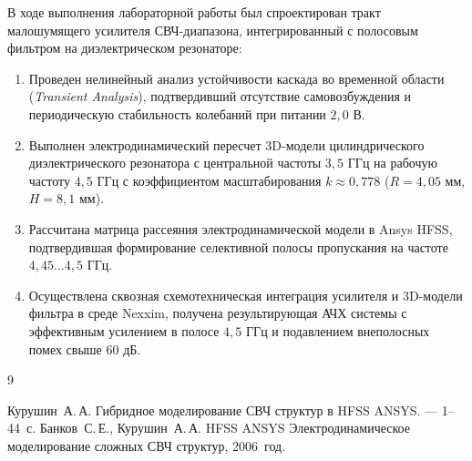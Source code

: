 В ходе выполнения лабораторной работы был спроектирован тракт малошумящего усилителя СВЧ-диапазона, интегрированный с полосовым фильтром на диэлектрическом резонаторе:
\begin{enumerate}
    \item Проведен нелинейный анализ устойчивости каскада во временной области (\textit{Transient Analysis}), подтвердивший отсутствие самовозбуждения и периодическую стабильность колебаний при питании $2{,}0\text{ В}$.
    \item Выполнен электродинамический пересчет 3D-модели цилиндрического диэлектрического резонатора с центральной частоты $3{,}5\text{ ГГц}$ на рабочую частоту $4{,}5\text{ ГГц}$ с коэффициентом масштабирования $k \approx 0{,}778$ ($R = 4{,}05\text{ мм}$, $H = 8{,}1\text{ мм}$).
    \item Рассчитана матрица рассеяния электродинамической модели в Ansys HFSS, подтвердившая формирование селективной полосы пропускания на частоте $4{,}45\dots 4{,}5\text{ ГГц}$.
    \item Осуществлена сквозная схемотехническая интеграция усилителя и 3D-модели фильтра в среде Nexxim, получена результирующая АЧХ системы с эффективным усилением в полосе $4{,}5\text{ ГГц}$ и подавлением внеполосных помех свыше $60\text{ дБ}$.
\end{enumerate}

\newpage
\begin{thebibliography}{9}
 Курушин~А.\,А. Гибридное моделирование СВЧ структур в HFSS ANSYS. --- 1--44~с.
 Банков~С.\,Е., Курушин~А.\,А. HFSS ANSYS Электродинамическое моделирование сложных СВЧ структур, 2006~год.
\end{thebibliography}
